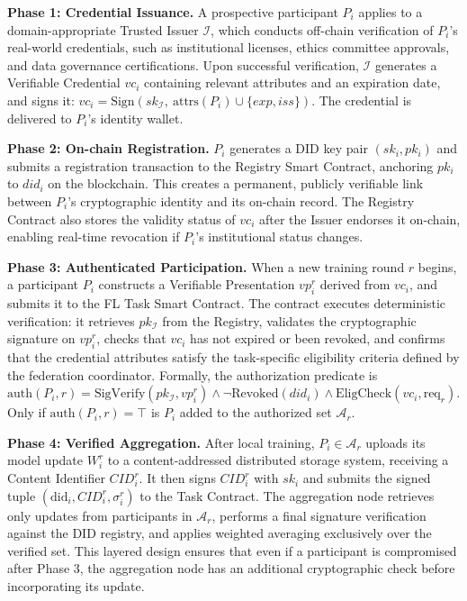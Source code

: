 \documentclass{sbc2023}
\begin{document}
\textbf{Phase 1: Credential Issuance.} A prospective participant $P_i$ applies to a domain-appropriate Trusted Issuer $\mathcal{I}$, which conducts off-chain verification of $P_i$'s real-world credentials, such as institutional licenses, ethics committee approvals, and data governance certifications. Upon successful verification, $\mathcal{I}$ generates a Verifiable Credential $vc_i$ containing relevant attributes and an expiration date, and signs it: $vc_i = \text{Sign}(sk_{\mathcal{I}},\ \text{attrs}(P_i) \cup \{exp, iss\})$. The credential is delivered to $P_i$'s identity wallet.

\textbf{Phase 2: On-chain Registration.} $P_i$ generates a DID key pair $(sk_i, pk_i)$ and submits a registration transaction to the Registry Smart Contract, anchoring $pk_i$ to $did_i$ on the blockchain. This creates a permanent, publicly verifiable link between $P_i$'s cryptographic identity and its on-chain record. The Registry Contract also stores the validity status of $vc_i$ after the Issuer endorses it on-chain, enabling real-time revocation if $P_i$'s institutional status changes.

\textbf{Phase 3: Authenticated Participation.} When a new training round $r$ begins, a participant $P_i$ constructs a Verifiable Presentation $vp_i^r$ derived from $vc_i$, and submits it to the FL Task Smart Contract. The contract executes deterministic verification: it retrieves $pk_{\mathcal{I}}$ from the Registry, validates the cryptographic signature on $vp_i^r$, checks that $vc_i$ has not expired or been revoked, and confirms that the credential attributes satisfy the task-specific eligibility criteria defined by the federation coordinator. Formally, the authorization predicate is $\text{auth}(P_i, r) = \text{SigVerify}(pk_\mathcal{I}, vp_i^r) \wedge \neg \text{Revoked}(did_i) \wedge \text{EligCheck}(vc_i, \text{req}_r)$. Only if $\text{auth}(P_i, r) = \top$ is $P_i$ added to the authorized set $\mathcal{A}_r$.

\textbf{Phase 4: Verified Aggregation.} After local training, $P_i \in \mathcal{A}_r$ uploads its model update $W_i^r$ to a content-addressed distributed storage system, receiving a Content Identifier $CID_i^r$. It then signs $CID_i^r$ with $sk_i$ and submits the signed tuple $(\text{did}_i, CID_i^r, \sigma_i^r)$ to the Task Contract. The aggregation node retrieves only updates from participants in $\mathcal{A}_r$, performs a final signature verification against the DID registry, and applies weighted averaging exclusively over the verified set. This layered design ensures that even if a participant is compromised after Phase 3, the aggregation node has an additional cryptographic check before incorporating its update.
\end{document}
